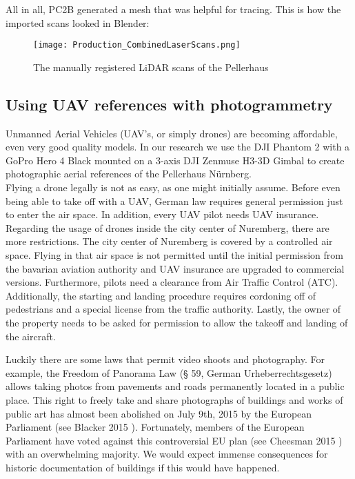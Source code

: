 All in all, PC2B generated a mesh that was helpful for tracing. This is how the imported scans looked in Blender:

\begin{figure}[h]
	\centering
	\texttt{[image: Production\_CombinedLaserScans.png]}
	\caption{The manually registered LiDAR scans of the Pellerhaus}
	\label{fig:production_laser_scans_combined}
\end{figure}




\subsection{Using UAV references with photogrammetry}

Unmanned Aerial Vehicles (UAV's, or simply drones) are becoming affordable, even very good quality models. In our research we use the DJI Phantom 2 with a GoPro Hero 4 Black mounted on a 3-axis DJI Zenmuse H3-3D Gimbal to create photographic aerial references of the Pellerhaus Nürnberg.\\

Flying a drone legally is not as easy, as one might initially assume. Before even being able to take off with a UAV, German law requires general permission just to enter the air space. In addition, every UAV pilot needs UAV insurance.\\

Regarding the usage of drones inside the city center of Nuremberg, there are more restrictions. The city center of Nuremberg is covered by a controlled air space. Flying in that air space is not permitted until the initial permission from the bavarian aviation authority and UAV insurance are upgraded to commercial versions. Furthermore, pilots need a clearance from Air Traffic Control (ATC). Additionally, the starting and landing procedure requires cordoning off of pedestrians and a special license from the traffic authority. Lastly, the owner of the property needs to be asked for permission to allow the takeoff and landing of the aircraft.\\

\pagebreak

Luckily there are some laws that permit video shoots and photography. For example, the Freedom of Panorama Law (§ 59, German Urheberrechtsgesetz) allows taking photos from pavements and roads permanently located in a public place. This right to freely take and share photographs of buildings and works of public art has almost been abolished on July 9th, 2015 by the European Parliament (see Blacker 2015 \parencite{freedomOfPanoramaUnderAttack}). Fortunately, members of the European Parliament have voted against this controversial EU plan (see Cheesman 2015 \parencite{freedomOfPanoramaSaved}) with an overwhelming majority. We would expect immense consequences for historic documentation of buildings if this would have happened.\\

